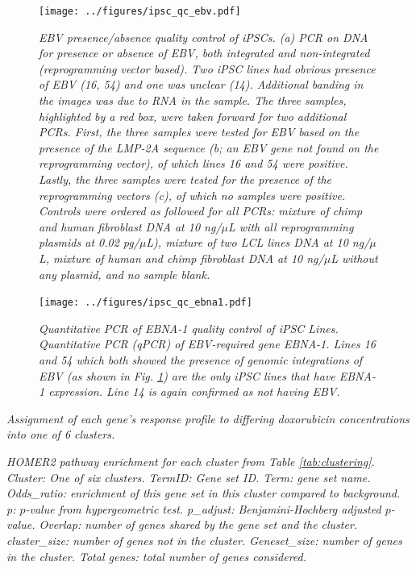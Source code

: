 \documentclass{article}
\begin{document}
\begin{figure}[h]
\begin{center}
    \texttt{[image: ../figures/ipsc\_qc\_ebv.pdf]} 
    \caption{\it{EBV presence/absence quality control of iPSCs. (a) PCR on DNA for presence or absence of EBV, both integrated and non-integrated (reprogramming vector based). Two iPSC lines had obvious presence of EBV (16, 54) and one was unclear (14). Additional banding in the images was due to RNA in the sample. The three samples, highlighted by a red box, were taken forward for two additional PCRs. First, the three samples were tested for EBV based on the presence of the LMP-2A sequence (b; an EBV gene not found on the reprogramming vector), of which lines 16 and 54 were positive. Lastly, the three samples were tested for the presence of the reprogramming vectors (c), of which no samples were positive. Controls were ordered as followed for all PCRs: mixture of chimp and human fibroblast DNA at 10 ng/$\mu$L with all reprogramming plasmids at 0.02 pg/$\mu$L), mixture of two LCL lines DNA at 10 ng/$\mu$L, mixture of human and chimp fibroblast DNA at 10 ng/$\mu$L without any plasmid, and no sample blank.}}
    \label{fig:ipsc_qc_ebv}
    \end{center}
\end{figure}


\begin{figure}[h]
\begin{center}
    \texttt{[image: ../figures/ipsc\_qc\_ebna1.pdf]} 
    \caption{\it{Quantitative PCR of EBNA-1 quality control of iPSC Lines. Quantitative PCR (qPCR) of EBV-required gene EBNA-1. Lines 16 and 54 which both showed the presence of genomic integrations of EBV (as shown in Fig. \ref{fig:ipsc_qc_ebv}) are the only iPSC lines that have EBNA-1 expression. Line 14 is again confirmed as not having EBV.}}
    \label{fig:ipsc_qc_ebna1}
    \end{center}
\end{figure}

\setcounter{table}{0}
\makeatletter 
\renewcommand{\thetable}{S\@arabic\c@table}

\begin{table} %
    \caption{\it{Assignment of each gene's response profile to differing doxorubicin concentrations into one of 6 clusters.}}
    \label{tab:clustering}
\end{table}

\begin{table}%
    \caption{\it{HOMER2 pathway enrichment for each cluster from Table \ref{tab:clustering}.  \emph{Cluster:} One of six clusters. \emph{TermID}: Gene set ID. \emph{Term}: gene set name.  \emph{Odds\_ratio}: enrichment of this gene set in this cluster compared to background. \emph{p}: $p$-value from hypergeometric test. \emph{p\_adjust}: Benjamini-Hochberg adjusted $p$-value. \emph{Overlap}: number of genes shared by the gene set and the cluster. \emph{cluster\_size}: number of genes not in the cluster.  \emph{Geneset\_size}: number of genes in the cluster. \emph{Total genes}: total number of genes considered.}}
    \label{tab:pathway_enrich}
\end{table}
\end{document}
